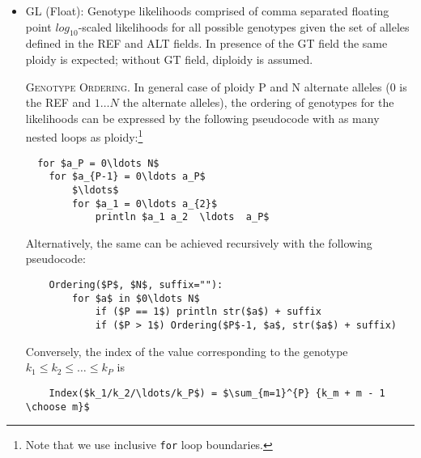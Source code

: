 \documentclass[8pt]{article}
\begin{document}
\begin{itemize}
  \item GL (Float): Genotype likelihoods comprised of comma separated floating point $log_{10}$-scaled likelihoods for all possible genotypes given the set of alleles defined in the REF and ALT fields. In presence of the GT field the same ploidy is expected; without GT field, diploidy is assumed.

  \textsc{Genotype Ordering.} \label{genotype-fields:genotype-ordering}
  In general case of ploidy P and N alternate alleles (0 is the REF and $1\ldots N$
  the alternate alleles), the ordering of genotypes for the likelihoods can
  be expressed by the following pseudocode with as many nested loops as ploidy:\footnote{Note that we use inclusive \texttt{for} loop boundaries.}
  \begingroup
  \small
  \begin{lstlisting}
  for $a_P = 0\ldots N$
    for $a_{P-1} = 0\ldots a_P$
        $\ldots$
        for $a_1 = 0\ldots a_{2}$
            println $a_1 a_2  \ldots  a_P$
  \end{lstlisting}
  \endgroup

  Alternatively, the same can be achieved recursively with the following pseudocode:
  \begingroup
  \small
  \begin{lstlisting}
    Ordering($P$, $N$, suffix=""):
        for $a$ in $0\ldots N$
            if ($P == 1$) println str($a$) + suffix
            if ($P > 1$) Ordering($P$-1, $a$, str($a$) + suffix)
  \end{lstlisting}
  \endgroup

  Conversely, the index of the value corresponding to the genotype $k_1\le k_2\le\ldots\le k_P$ is
  \begingroup
  \small
  \begin{lstlisting}
    Index($k_1/k_2/\ldots/k_P$) = $\sum_{m=1}^{P} {k_m + m - 1 \choose m}$
  \end{lstlisting}
  \endgroup


\end{itemize}
\end{document}
